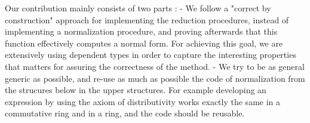 Our contribution mainly consists of two parts :
	- We follow a "correct by construction" approach for implementing the reduction procedures, instead of implementing a normalization procedure, and proving afterwards that this function effectively computes a normal form. For achieving this goal, we are extensively using dependent types in order to capture the interesting properties that matters for assuring the correctness of the method. 
	- We try to be as general generic as possible, and re-use as much as possible the code of normalization from the strucures below in the upper structures. For example developing an expression by using the axiom of distributivity works exactly the same in a commutative ring and in a ring, and the code should be reusable.